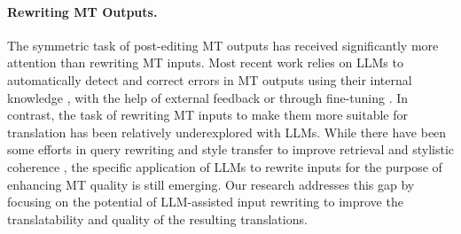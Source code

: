 \paragraph{Rewriting MT Outputs.} 
The symmetric task of post-editing MT outputs has received significantly more attention than rewriting MT inputs. Most recent work relies on LLMs to automatically detect and correct errors in MT outputs using their internal knowledge \citep{raunak-etal-2023-leveraging, zeng2024improving, chen2024iterative}, with the help of external feedback \citep{ki2024guiding, xu2024llmrefine} or through fine-tuning \citep{treviso2024xtowermultilingualllmexplaining}. In contrast, the task of rewriting MT inputs to make them more suitable for translation has been relatively underexplored with LLMs. While there have been some efforts in query rewriting and style transfer to improve retrieval \citep{mao-etal-2023-search, Zhu_2024} and stylistic coherence \citep{ye-etal-2023-enhancing, hallinan2023steer}, the specific application of LLMs to rewrite inputs for the purpose of enhancing MT quality is still emerging. Our research addresses this gap by focusing on the potential of LLM-assisted input rewriting to improve the translatability and quality of the resulting translations.



